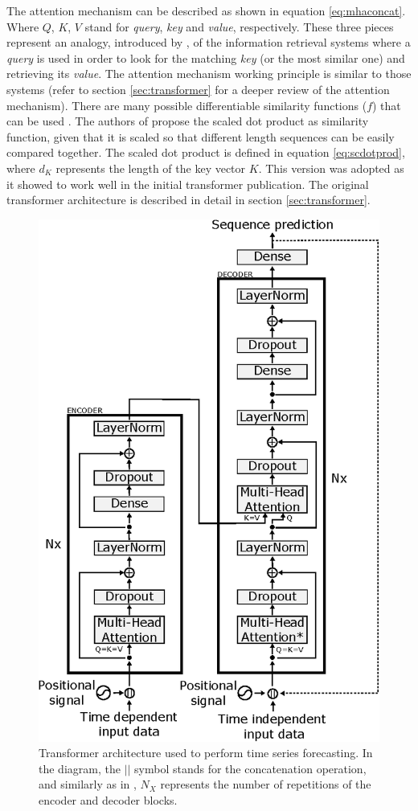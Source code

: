 The attention mechanism can be described as shown in equation \ref{eq:mhaconcat}. Where $Q$, $K$, $V$ stand for \textit{query}, \textit{key} and \textit{value}, respectively. These three pieces represent an analogy, introduced by \autocite{vaswani2017}, of the information retrieval systems where a \textit{query} is used in order to look for the matching \textit{key} (or the most similar one) and retrieving its \textit{value}. The attention mechanism working principle is similar to those systems (refer to section \ref{sec:transformer} for a deeper review of the attention mechanism). There are many possible differentiable similarity functions ($f$) that can be used \autocite{uday2019}. The authors of \autocite{vaswani2017} propose the scaled dot product as similarity function, given that it is scaled so that different length sequences can be easily compared together. The scaled dot product is defined in equation \ref{eq:scdotprod},  where $d_K$ represents the length of the key vector $K$. This version was adopted as it showed to work well in the initial transformer publication. The original transformer architecture is described in detail in section \ref{sec:transformer}.

\begin{figure}[h!]
	\centering
	\includegraphics[width=0.7\linewidth]{salesforecast/images/transformer}
	\caption[Diagram of the \textit{transformer} architecture]{Transformer architecture used to perform time series forecasting. In the diagram, the $||$ symbol stands for the concatenation operation, and similarly as in \autocite{vaswani2017}, $N_X$ represents the number of repetitions of the encoder and decoder blocks.}
	\label{fig:salesforecast_transformer}
\end{figure}


